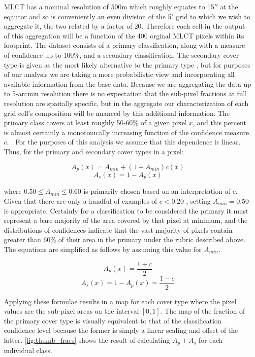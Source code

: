 MLCT has a nominal resolution of 500m which roughly equates to 15$''$
at the eqautor and so is conveniently an even division of the 5$'$
grid to which we wish to aggregate it, the two related by a factor of
20.  Therefore each cell in the output of this aggregation will be a
function of the 400 orginal MLCT pixels within its footprint.  The
dataset consists of a primary classification, along with a measure of
confidence up to 100\%, and a secondary classification.  The secondary
cover type is given as the most likely alternative to the primary type
\citep{Friedl2010}, but for purposes of our analysis we are taking a
more probabilistic view and incorporating all available information
from the base data.  Because we are aggregating the data up to
5-arcmin resolution there is no expectation that the sub-pixel
fractions at full resolution are spaitally specific, but in the
aggregate our characterization of each grid cell's composition will be
nuanced by this additional information.  The primary class covers at
least roughly 50-60\% of a given pixel $x$, and this percent is almost
certainly a monotonically increasing function of the confidence
measure $c$.  .  For the purposes of this
analysis we assume that this dependence is linear. Thus, for the
primary and secondary cover types in a pixel:

$$
A_p(x) = A_{min} + (1 - A_{min}) c(x)
$$
$$
A_s(x) = 1 - A_p(x)
$$

where $0.50 \le A_{min} \le 0.60$ is primarily chosen based on an
interpretation of $c$.  Given that there are only a handful of
examples of $c < 0.20$ , setting $A_{min} = 0.50$ is appropriate.
Certainly for a classification to be considered the primary it must
represent a bare majority of the area covered by that pixel at
minimum, and the distributions of confidences indicate that the vast
majority of pixels contain greater than 60\% of their area in the
primary under the rubric described above.  The equations are simplified
as follows by assuming this value for $A_{min}$.

$$
A_p(x) = \dfrac{1 + c}{2}
$$
$$
A_s(x) = 1 - A_p(x) = \dfrac{1-c}{2}
$$




Applying these formulae results in a map for each cover type where the
pixel values are the sub-pixel areas on the interval $[0,1]$.  The map
of the fraction of the primary cover type is visually equivalent to
that of the classification confidence level because the former is
simply a linear scaling and offset of the latter.  \autoref{fig:thumb_fracs} shows the result of calculating $A_p + A_s$ for each individual class.  

